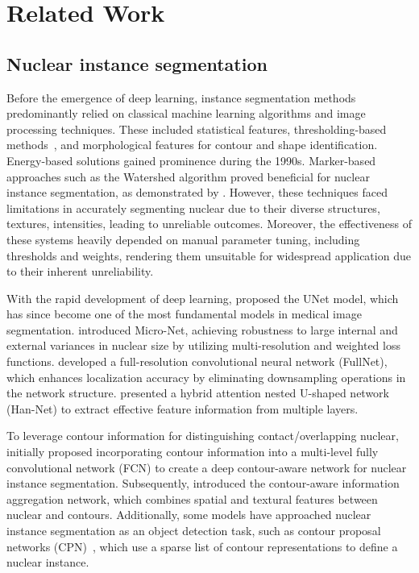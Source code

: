 \section{Related Work}
\subsection{Nuclear instance segmentation}
Before the emergence of deep learning, instance segmentation methods predominantly relied on classical machine learning algorithms and image processing techniques. 
These included statistical features, thresholding-based methods~\citep{latorre2013segmentation, abbas2014occluded, sheeba2014splitting}, and morphological features for contour and shape identification. 
Energy-based solutions gained prominence during the 1990s. 
Marker-based approaches such as the Watershed algorithm proved beneficial for nuclear instance segmentation, as demonstrated by \citet{cheng2008segmentation}. 
However, these techniques faced limitations in accurately segmenting nuclear due to their diverse structures, textures, intensities, leading to unreliable outcomes. 
Moreover, the effectiveness of these systems heavily depended on manual parameter tuning, including thresholds and weights, rendering them unsuitable for widespread application due to their inherent unreliability.

With the rapid development of deep learning, \citet{ronneberger2015u} proposed the UNet model, which has since become one of the most fundamental models in medical image segmentation. 
\citet{raza2019micro} introduced Micro-Net, achieving robustness to large internal and external variances in nuclear size by utilizing multi-resolution and weighted loss functions. \citet{qu2019improving} developed a full-resolution convolutional neural network (FullNet), which enhances localization accuracy by eliminating downsampling operations in the network structure. 
\citet{he2021hybrid} presented a hybrid attention nested U-shaped network (Han-Net) to extract effective feature information from multiple layers.

To leverage contour information for distinguishing contact/overlapping nuclear, \citet{chen2017dcan} initially proposed incorporating contour information into a multi-level fully convolutional network (FCN) to create a deep contour-aware network for nuclear instance segmentation. Subsequently,
\citet{zhou2019cia} introduced the contour-aware information aggregation network, which combines spatial and textural features between nuclear and contours. 
Additionally, some models have approached nuclear instance segmentation as an object detection task, such as contour proposal networks (CPN)~\citep{upschulte2022contour}, which use a sparse list of contour representations to define a nuclear instance.

